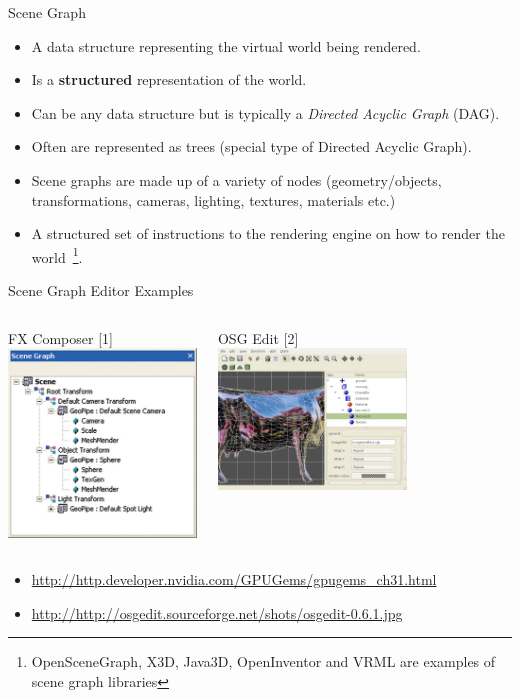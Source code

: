 \documentclass[xcolor=dvipsnames,t]{beamer}
\begin{document}
\begin{frame}{Scene Graph}
\begin{itemize} 
\item A data structure representing the virtual world being rendered.
\item Is a \textbf{structured} representation of the world.
\item Can be any data structure but is typically a \emph{Directed Acyclic Graph} (DAG).
\item Often are represented as trees (special type of Directed Acyclic Graph). 
\item Scene graphs are made up of a variety of nodes (geometry/objects,
transformations, cameras, lighting, textures, materials etc.) 
\item A structured set of instructions to the rendering engine on how to render
the world~\footnote{OpenSceneGraph, X3D, Java3D, OpenInventor and VRML are examples
of scene graph libraries}. 
\end{itemize} 
\end{frame} 

\lstset{escapechar=@,style=json}
\begin{frame}{Scene Graph Editor Examples}
\begin{columns}[t] 
\begin{center} 
FX Composer [1] \\[0.1cm] 
\includegraphics[width=5cm]{scene-graph-fxcomposer} 
\end{center} 
\begin{center}  
OSG Edit [2] \\[0.1cm] 
\includegraphics[width=5cm]{scene-graph-osgedit} 
\end{center} 
\end{columns} 
\small
\begin{itemize} 
\item [1] \url{http://http.developer.nvidia.com/GPUGems/gpugems_ch31.html} 
\item [2] \url{http://http://osgedit.sourceforge.net/shots/osgedit-0.6.1.jpg} 
\end{itemize} 
\normalsize
\end{frame} 
\end{document}
